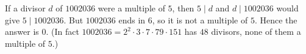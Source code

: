 If a divisor $d$ of $1002036$ were a multiple of $5$, then $5\mid d$ and $d\mid1002036$ would give $5\mid1002036$. But $1002036$ ends in $6$, so it is not a multiple of $5$. Hence the answer is $\boxed{0}$. (In fact $1002036=2^2\cdot3\cdot7\cdot79\cdot151$ has $48$ divisors, none of them a multiple of $5$.)
